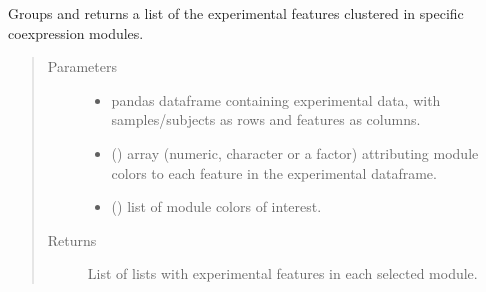 \documentclass[letterpaper,10pt,english]{sphinxmanual}
\begin{document}
\begin{fulllineitems}
\label{\detokenize{_autosummary/analytics_core.analytics:analytics_core.analytics.wgcnaAnalysis.get_ModuleFeatures}}
Groups and returns a list of the experimental features clustered in specific co\sphinxhyphen{}expression modules.
\begin{quote}\begin{description}
\item[{Parameters}] \leavevmode\begin{itemize}
\item {} 
 \textendash{} pandas dataframe containing experimental data, with samples/subjects as rows and features as columns.

\item {} 
 () \textendash{} array (numeric, character or a factor) attributing module colors to each feature in the experimental dataframe.

\item {} 
 () \textendash{} list of module colors of interest.

\end{itemize}

\item[{Returns}] \leavevmode
List of lists with experimental features in each selected module.

\end{description}\end{quote}

\end{fulllineitems}

\end{document}
